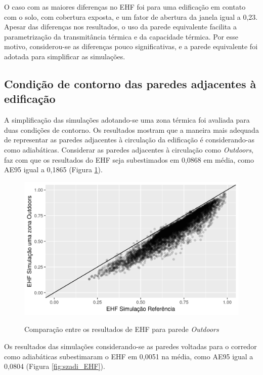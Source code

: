 \documentclass[brazil,hardcopy,openany,a4paper]{ufscthesis}
\begin{document}
		O caso com as maiores diferenças no EHF foi para uma edificação em contato com o solo, com cobertura exposta, e um fator de abertura da janela igual a 0,23.
		Apesar das diferenças nos resultados, o uso da parede equivalente facilita a parametrização da transmitância térmica e da capacidade térmica. Por esse motivo, considerou-se as diferenças pouco significativas, e a parede equivalente foi adotada para simplificar as simulações.
		
		\subsection{Condição de contorno das paredes adjacentes à edificação}
		
		A simplificação das simulações adotando-se uma zona térmica foi avaliada para duas condições de contorno. Os resultados mostram que a maneira mais adequada de representar as paredes adjacentes à circulação da edificação é considerando-as como adiabáticas. Considerar as paredes adjacentes à circulação como \textit{Outdoors}, faz com que os resultados do EHF seja subestimados em 0,0868 em média, como AE95 igual a 0,1865 (Figura \ref{fig:szout_EHF}).
		
		\begin{figure}[H]
			\centering
			\caption{Comparação entre os resultados de EHF para parede \textit{Outdoors}}
			\includegraphics[width=1\linewidth]{img/szout_EHF_scatter.png}
			\label{fig:szout_EHF}
		\end{figure}
		
		Os resultados das simulações considerando-se as paredes voltadas para o corredor como adiabáticas subestimaram o EHF em 0,0051 na média, como AE95 igual a 0,0804 (Figura \ref{fig:szadi_EHF}).
		
\end{document}
